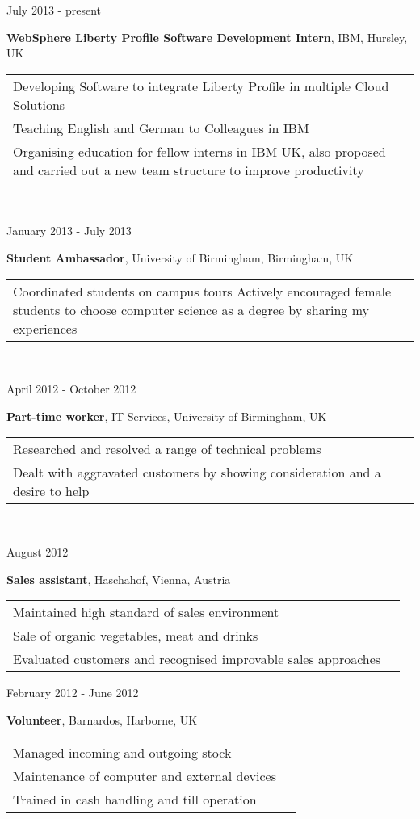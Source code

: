 \documentclass{article}
\newenvironment{changemargin}[2]{%
  \begin{list}{}{%
    \setlength{\topsep}{0pt}%
    \setlength{\leftmargin}{#1}%
    \setlength{\rightmargin}{#2}%
    \setlength{\listparindent}{\parindent}%
    \setlength{\itemindent}{\parindent}%
    \setlength{\parsep}{\parskip}%
  }%
  \item[]}{\end{list}
}
\newenvironment{body} {
	\vspace*{-16pt}
	\begin{changemargin}{0in}{0in}
  }	
	{
\end{changemargin}
\medskip
}
\newcommand{\paraW}[4]{
	\begin{minipage}[t]{0.6\textwidth}
	\textbf{#1}, #2, #3 \vspace{2pt}\\
	\begin{tabular}{p{10cm}l}
		#4
	\end{tabular}
	\end{minipage}
	\medskip
}
\newcommand{\timerange}[1]{
	\begin{minipage}[t]{0.30\textwidth}
		#1
	\end{minipage}
}
\begin{document}
\begin{body}
	\vspace{14pt}
	
	\timerange{July 2013 - present}
	\paraW{WebSphere Liberty Profile Software Development Intern}{IBM}{Hursley, UK}{
		Developing Software to integrate Liberty Profile in multiple Cloud Solutions\\
		Teaching English and German to Colleagues in IBM\\
		Organising education for fellow interns in IBM UK, also proposed and carried out a new team structure to improve productivity
	}\\
	
	\timerange{January 2013 - July 2013}
	\paraW{Student Ambassador}{University of Birmingham}{Birmingham, UK}{
		Coordinated students on campus tours
		Actively encouraged female students to choose computer science as a degree by sharing my experiences
	}\\
	
	\timerange{April 2012 - October 2012}
	\paraW{Part-time worker}{IT Services}{University of Birmingham, UK}{
		Researched and resolved a range of technical problems\\
		Dealt with aggravated customers by showing consideration and a desire to help
	}\\

	\timerange{August 2012}
	\paraW{Sales assistant}{Haschahof}{Vienna, Austria}{
		Maintained high standard of sales environment \\
		Sale of organic vegetables, meat and drinks \\
		Evaluated customers and recognised improvable sales approaches\\
	}
	
	\timerange{February 2012 - June 2012}
	\paraW{Volunteer}{Barnardos}{Harborne, UK}{
		Managed incoming and outgoing stock \\
		Maintenance of computer and external devices\\
		Trained in cash handling and till operation \\
	}


\end{body}
\end{document}
